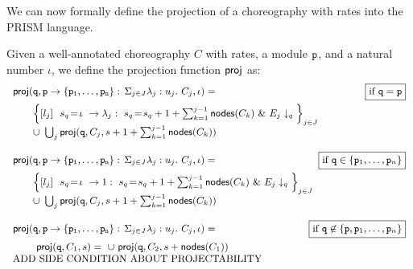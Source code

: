     We can now formally define the projection of a choreography with
    rates into the PRISM language.
    \begin{definition}\label{def:projCTMC} Given a
      well-annotated choreography $C$ with
      rates, a module $\mathtt{p}$, and a natural number $\iota$, we
      define the projection function $\mathsf{proj}$ as:
      \begin{displaymath}\small
        \begin{array}{lr}

          \proj (\role q,\interact{p}{\role p_1,\ldots,\role p_n}, \iota)= 
          &  \boxed{\text{if }\role q=\role p}\\[2mm]
          \qquad
          \Big\{\commandBase {l_j} {\ s_{q}\!=\! \iota} {\lambda_j:\ s_{q}\!=\!
          s_{q} +1+\sum_{k=1}^{j-1}\mathsf{nodes}({C_k})}\ \&\ \projE
          {E_j}q\Big\}_{j\in J}
          \\
          \qquad\cup\ \bigcup_{j} \proj (\role q, C_j, s+1+\sum_{k=1}^{j-1}\mathsf{nodes}({C_k}))
          \\\\

          \proj (\role q,\interact{p}{\role p_1,\ldots,\role p_n}, \iota)= 
          &  \!\!\!\!\!\! \!\!\!\!\!\!\boxed{\text{if }\role q\in\{\role p_1,\ldots,\role p_n\}}\\[2mm]
          \qquad
          \Big\{\commandBase {l_j} {\ s_{q}\!=\! \iota} {1:\ s_{q}\!=\!
          s_{q} +1+\sum_{k=1}^{j-1}\mathsf{nodes}({C_k})}\ \&\ \projE
          {E_j}q\Big\}_{j\in J}
          \\
          \qquad\cup\ \bigcup_{j} \proj (\role q, C_j, s+1+\sum_{k=1}^{j-1}\mathsf{nodes}({C_k}))
          \\\\

          \proj (\role q,\interact{p}{\role p_1,\ldots,\role p_n}, \iota)= 
          &  \!\!\!\!\!\! \!\!\!\!\!\!\boxed{\text{if }\role q\not\in\{\role p, 
            \role p_1,\ldots,\role p_n\}}\\[2mm]
          \qquad\ \proj (\role{q}, C_1, s)=
          \ \cup\
          \proj (\role{q}, C_2, s+\mathsf{nodes}(C_1)) 
          \\ \text{ADD SIDE CONDITION ABOUT PROJECTABILITY}
          \\\\


\end{array}
\end{displaymath}
\end{definition}
